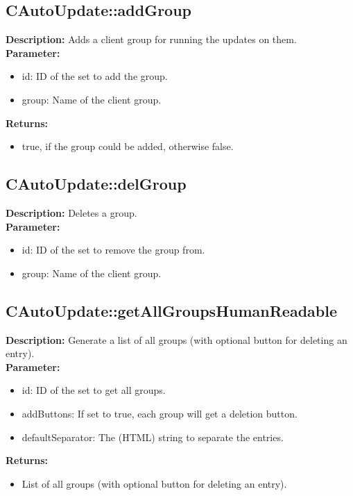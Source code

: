 \subsection{CAutoUpdate::addGroup}
\textbf{Description:} Adds a client group for running the updates on them.\\
\textbf{Parameter:}
\begin{itemize}
\item id: ID of the set to add the group.
\item group: Name of the client group.
\end{itemize}
\textbf{Returns:}
\begin{itemize}
\item true, if the group could be added, otherwise false.
\end{itemize}

\subsection{CAutoUpdate::delGroup}
\textbf{Description:} Deletes a group.\\
\textbf{Parameter:}
\begin{itemize}
\item id: ID of the set to remove the group from.
\item group: Name of the client group.
\end{itemize}

\subsection{CAutoUpdate::getAllGroupsHumanReadable}
\textbf{Description:} Generate a list of all groups (with optional button for deleting an entry).\\
\textbf{Parameter:}
\begin{itemize}
\item id: ID of the set to get all groups.
\item addButtons: If set to true, each group will get a deletion button.
\item defaultSeparator: The (HTML) string to separate the entries.
\end{itemize}
\textbf{Returns:}
\begin{itemize}
\item List of all groups (with optional button for deleting an entry).
\end{itemize}

